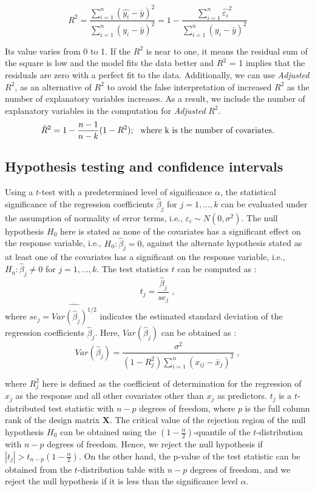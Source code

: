 \documentclass[12 pt]{scrartcl}
\begin{document}
\[
{R^2} = \frac{{\sum_{i=1}^n{{(\hat{y_i} - \bar{y})}^2}}}{\sum_{i=1}^n{{(y_i - \bar{y})}^2}} = 1 - \frac{\sum_{i=1}^n{{\hat{\varepsilon_i}}^2}}{\sum_{i=1}^n{{(y_i - \bar{y})}^2}} 
\] \citep[p.~113]{regression}

Its value varies from 0 to 1. If the $R^2$ is near to one, it means the residual sum of the square is low and the model fits the data better and $R^2$ = 1 implies that the residuals are zero with a perfect fit to the data. Additionally, we can use \emph{Adjusted} $R^2$, as an alternative of $R^2$ to avoid the false interpretation of increased $R^2$ as the number of explanatory variables increases. As a result, we include the number of explanatory variables in the computation for \emph{Adjusted} $R^2$.
\[
{\bar{R}}^2 = 1  - {\frac{n - 1}{n - k}}(1 - R^2);\,\,
\text{\,\,where\,\,k\,\,is\,\,the\,\,number\,\,of\,\,covariates.}
\] 
\citep[p.~148]{regression}

\subsection{Hypothesis testing and confidence intervals}

Using a $t$-test with a predetermined level of significance $\alpha$, the statistical significance of the regression coefficients $\hat{\beta}_j$ for $j=1,...,k$ can be evaluated under the assumption of normality of error terms, i.e., $\varepsilon_i \sim N(0,\sigma^2)$. The null hypothesis $H_0$ here is stated as none of the covariates has a significant effect on the response variable, i.e., $H_0:\hat{\beta}_j=0$, against the alternate hypothesis stated as at least one of the covariates has a significant on the response variable, i.e., $H_a:\hat{\beta}_j\neq0$ for $j=1,...,k$. The test statistics $t$ can be computed as \citep[p. 125]{regression}:
\[
t_j = \frac{\hat{\beta}_j}{se_j}\;,
\]
where $se_j = \widehat{Var(\hat{\beta}_j)^{1/2}}$ indicates the estimated standard deviation of the regression coefficients $\hat{\beta}_j$. Here, $Var(\hat{\beta}_j)$ can be obtained as \citep[p. 116]{regression}:
\[
Var(\hat{\beta}_j) = \frac{\sigma^2}{(1-R_j^2)\sum_{i=1}^{n}(x_{ij}-\bar{x}_j)^2}\;,
\]


where \(R_j^2\) here is defined as the coefficient of determination for the regression of \(x_j\) as the response and all other covariates other than \(x_j\) as predictors. \(t_j\) is a \(t\)-distributed test statistic with \(n-p\) degrees of freedom, where \(p\) is the full column rank of the design matrix \(\mathbf{X}\). The critical value of the rejection region of the null hypothesis \(H_0\) can be obtained using the \((1 - \frac{\alpha}{2})\)-quantile of the \(t\)-distribution with \(n-p\) degrees of freedom. Hence, we reject the null hypothesis if \(|t_j| > t_{n-p}(1-\frac{\alpha}{2})\). On the other hand, the p-value of the test statistic can be obtained from the \(t\)-distribution table with \(n-p\) degrees of freedom, and we reject the null hypothesis if it is less than the significance level \(\alpha\).
\end{document}

